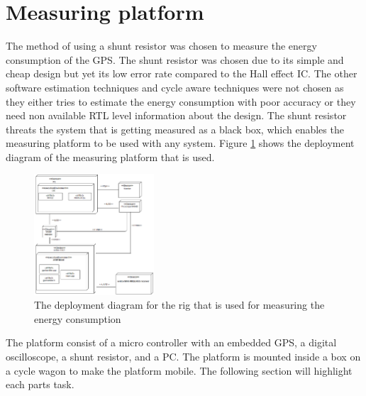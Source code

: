 \section{Measuring platform}

The method of using a shunt resistor was chosen to measure the energy consumption of the GPS. The shunt resistor was chosen due to its simple and cheap design but yet its low error rate compared to the Hall effect IC. The other software estimation techniques and cycle aware techniques were not chosen as they either tries to estimate the energy consumption with poor accuracy or they need non available RTL level information about the design. The shunt resistor threats the system that is getting measured as a black box, which enables the measuring platform to be used with any system.  Figure \ref{fig:deploy} shows the deployment diagram of the measuring platform that is used. 

\begin{figure}[H]
\centering
\includegraphics[height=4.5cm]{Project_Report/Images/deploy.PNG}
\caption{The deployment diagram for the rig that is used for measuring the energy consumption}
\label{fig:deploy}
\end{figure}

The platform consist of a micro controller with an embedded GPS, a digital oscilloscope, a shunt resistor, and a PC. The platform is mounted inside a box on a cycle wagon to make the platform mobile. The following section will highlight each parts task. 

